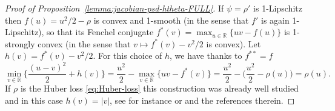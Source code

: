 \documentclass[11pt]{amsart}
\numberwithin{equation}{section}
\numberwithin{equation}{section}
\def\real{{\mathbb{R}}}
\def\R{{\real}}
\begin{document}
\begin{proof}[Proof of Proposition~\ref{lemma:jacobian-psd-htheta-FULL}]
    If $\psi=\rho'$ is 1-Lipschitz 
    then $f(u) =  u^2/2 - \rho$ is convex
    and 1-smooth (in the sense that $f'$ is again 1-Lipschitz),
    so that its Fenchel conjugate $f^*(v) = \max_{u\in\R} \{ uv - f(u) \}$
    is 1-strongly convex (in the sense that $v\mapsto f^*(v) - v^2/2$ is convex).
    Let $h(v) = f^*(v) - v^2/2$.
    For this choice of $h$, we have thanks to $f^{**} = f$
    $$\min_{v\in\R} \big\{ \frac{(u-v)^2}{2} + h(v) \big\}
    = \frac{u^2}{2} - \max_{v\in\R} \{uv - f^*(v)\} = \frac{u^2}{2}
    - \big(\frac{u^2}{2} - \rho(u)\big) = \rho(u).
    $$
    If $\rho$ is the Huber loss \eqref{eq:Huber-loss} this construction
    was already well studied and in this case  $h(v)=|v|$,
    see for instance \cite[Section 6]{donoho2016high} or
    \cite{dalalyan2019outlier} and the references therein.


\end{proof}
\end{document}
